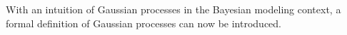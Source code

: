 			With an intuition of Gaussian processes in the Bayesian modeling context, a formal definition of Gaussian processes can now be introduced. 
			
%					
%			
%
			
